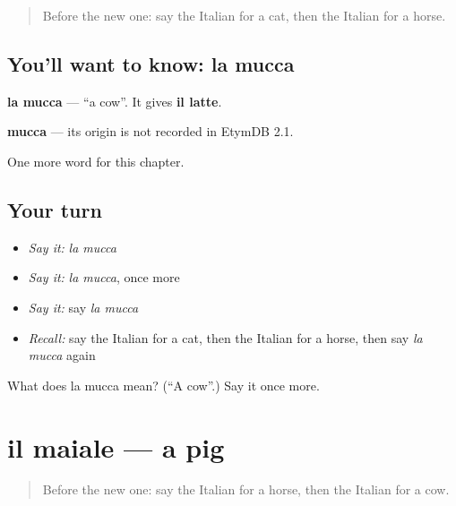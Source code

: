 \label{lesson:IT-C68-mucca}



\begin{quote}
Before the new one: say the Italian for a cat, then the Italian for a horse.
\end{quote}

\subsection*{You'll want to know: la mucca}
\textbf{la mucca} — \textquotedblleft{}a cow\textquotedblright{}. It gives \textbf{il latte}.

\begin{cousinweb}
\textbf{mucca} — its origin is not recorded in EtymDB 2.1.
\end{cousinweb}

\begin{grammarlens}[title={What you've built}]
One more word for this chapter.
\end{grammarlens}

\subsection*{Your turn}
\begin{itemize}
\raggedright
  \item \emph{Say it:} \emph{la mucca}
  \item \emph{Say it:} \emph{la mucca}, once more
  \item \emph{Say it:} say \emph{la mucca}
  \item \emph{Recall:} say the Italian for a cat, then the Italian for a horse, then say \emph{la mucca} again
\end{itemize}

\begin{tcolorbox}[breakable,colback=teal!4,colframe=teal!35!black,title={Before you move on}]
What does la mucca mean? (\textquotedblleft{}A cow\textquotedblright{}.) Say it once more.
\end{tcolorbox}
\section[il maiale]{il maiale — a pig}

\label{lesson:IT-C68-maiale}



\begin{quote}
Before the new one: say the Italian for a horse, then the Italian for a cow.
\end{quote}

